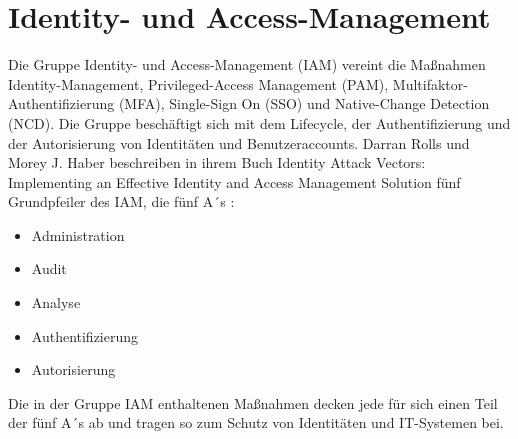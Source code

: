 \section{Identity- und Access-Management}
Die Gruppe \glqq{}Identity- und Access-Management\grqq{} (IAM) vereint die Maßnahmen \glqq{}Identity-Management\grqq{}, \glqq{}Privileged-Access Management\grqq{} (PAM), \glqq{}Multifaktor-Authentifizierung\grqq{} (MFA), \glqq{}Single-Sign On\grqq{} (SSO) und \glqq{}Native-Change Detection \grqq{} (NCD). Die Gruppe beschäftigt sich mit dem Lifecycle, der Authentifizierung und der Autorisierung von Identitäten und Benutzeraccounts.
\bigbreak
Darran Rolls und Morey J. Haber beschreiben in ihrem Buch \glqq{}Identity Attack Vectors: Implementing an Effective Identity and Access Management Solution\grqq{} fünf Grundpfeiler des IAM, die fünf \glqq{}A´s\grqq{} \autocite{rolls_haber_2020}:

\begin{itemize}
    \item Administration
    \item Audit
    \item Analyse
    \item Authentifizierung
    \item Autorisierung
\end{itemize}
\bigbreak
Die in der Gruppe IAM enthaltenen Maßnahmen decken jede für sich einen Teil der fünf A´s ab und tragen so zum Schutz von Identitäten und IT-Systemen bei. 

